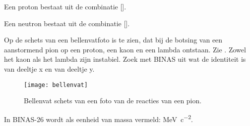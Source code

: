 \begin{questions}
\question
Een proton bestaat uit de combinatie [\Pup\Pup\Pdown].

\question
Een neutron bestaat uit de combinatie [\Pup\Pdown\Pdown].



\question
Op de schets van een bellenvatfoto is te zien, dat bij de botsing van een
aanstormend pion op een proton, een kaon en een lambda ontstaan. Zie
.
Zowel het kaon als het lambda zijn instabiel.
Zoek met BINAS uit wat de identiteit is van deeltje x en van deeltje y.

\begin{figure}[h]
    \centering
    \texttt{[image: bellenvat]}
    \caption{Bellenvat schets van een foto van de reacties van een pion.}
    \label{fig:bellenvat}
\end{figure}


\question
In BINAS-26 wordt als eenheid van massa vermeld: \si{MeV.c^{-2}}.
\end{questions}
